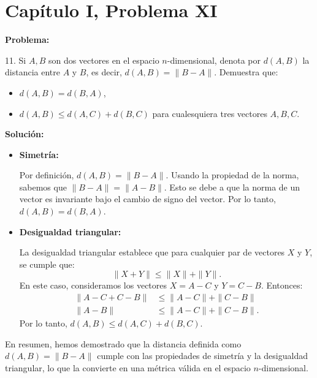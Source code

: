 \section*{Capítulo I, Problema XI}

\textbf{Problema:}

11. Si $A, B$ son dos vectores en el espacio $n$-dimensional, denota por $d(A, B)$ la distancia entre $A$ y $B$, es decir, $d(A, B) = \|B - A\|$. Demuestra que:
\begin{itemize}
    \item $d(A, B) = d(B, A)$,
    \item $d(A, B) \leq d(A, C) + d(B, C)$ para cualesquiera tres vectores $A, B, C$.
\end{itemize}

\textbf{Solución:}

\begin{itemize}
    \item \textbf{Simetría:}

    Por definición, $d(A, B) = \|B - A\|$. Usando la propiedad de la norma, sabemos que $\|B - A\| = \|A - B\|$. Esto se debe a que la norma de un vector es invariante bajo el cambio de signo del vector. Por lo tanto, $d(A, B) = d(B, A)$.

    \item \textbf{Desigualdad triangular:}

    La desigualdad triangular establece que para cualquier par de vectores $X$ y $Y$, se cumple que:
    \[
        \|X + Y\| \leq \|X\| + \|Y\|.
    \]
    En este caso, consideramos los vectores $X = A - C$ y $Y = C - B$. Entonces:
    \begin{align*}
        \|A - C + C - B\| &\leq \|A - C\| + \|C - B\| \\
        \|A - B\| &\leq \|A - C\| + \|C - B\|.
    \end{align*}
    Por lo tanto, $d(A, B) \leq d(A, C) + d(B, C)$.
\end{itemize}

En resumen, hemos demostrado que la distancia definida como $d(A, B) = \|B - A\|$ cumple con las propiedades de simetría y la desigualdad triangular, lo que la convierte en una métrica válida en el espacio $n$-dimensional.